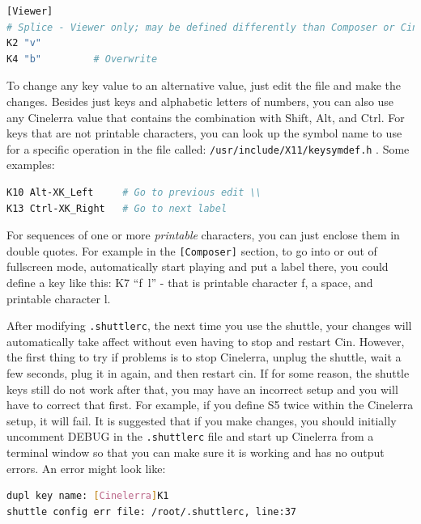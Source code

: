 \begin{lstlisting}[language=Bash,numbers=none]
[Viewer] 
# Splice - Viewer only; may be defined differently than Composer or Cinelerra 
K2 "v"         
K4 "b"         # Overwrite
\end{lstlisting}

\noindent To change any key value to an alternative value, just edit the file and make the changes.  Besides just keys and alphabetic letters of numbers, you can also use any Cinelerra value that contains the combination with Shift, Alt, and Ctrl.  For keys that are not printable characters, you can look up the symbol name to use for a specific operation in the file called: \texttt{/usr/include/X11/keysymdef.h} .
\noindent Some examples:

\begin{lstlisting}[language=bash,numbers=none]
K10 Alt-XK_Left  	# Go to previous edit \\
K13 Ctrl-XK_Right 	# Go to next label
\end{lstlisting}

\noindent For sequences of one or more \textit{printable} characters, you can just enclose them in double quotes.  For example in the \texttt{[Composer]} section, to go into or out of fullscreen mode, automatically start playing and put a label there, you could define a key like this:  K7 “f~l” - that is printable character f, a space, and printable character l.  

After modifying \texttt{.shuttlerc}, the next time you use the shuttle, your changes will automatically take affect without even having to stop and restart Cin.  However, the first thing to try if problems is to stop Cinelerra, unplug the shuttle, wait a few seconds, plug it in again, and then restart cin.  If for some reason, the shuttle keys still do not work after that, you may have an incorrect setup and you will have to correct that first.  For example, if you define S5 twice within the Cinelerra setup, it will fail.  It is suggested that if you make changes, you should initially uncomment DEBUG in the \texttt{.shuttlerc} file and start up Cinelerra from a terminal window so that you can make sure it is working and has no output errors.  An error might look like:

\begin{lstlisting}[language=Bash,numbers=none]
dupl key name: [Cinelerra]K1 
shuttle config err file: /root/.shuttlerc, line:37
\end{lstlisting}

